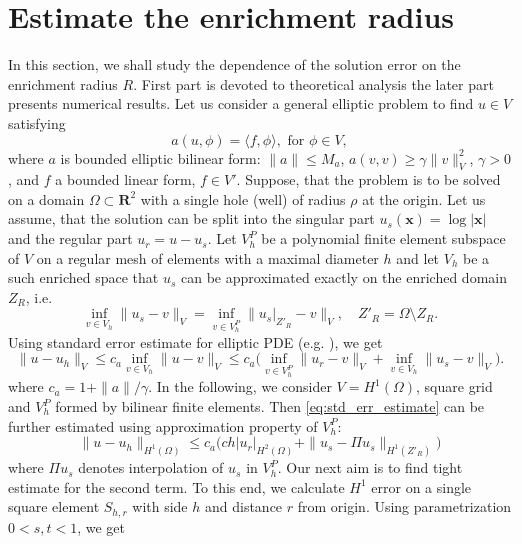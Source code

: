 \documentclass{elsarticle}
\def\vc#1{\mathbf{\boldsymbol{#1}}}     %
\def\abs#1{\left|#1\right|}
\def\norm#1{\| #1 \|}
\def\abs#1{| #1 |}
\newcommand{\R}{\mathbf{R}}
\begin{document}
\section{Estimate the enrichment radius} \label{sec:enrichemnt_radius}
In this section, we shall study the dependence of the solution error on the enrichment radius $R$. First part is devoted to 
theoretical analysis the later part presents numerical results.
Let us consider a general elliptic problem to find $u\in V$ satisfying
\[
   a(u, \phi) = \langle f, \phi \rangle, \text{ for } \phi \in V,
\]
where $a$ is bounded elliptic bilinear form: $\norm{a}\le M_a$, $a(v, v) \ge \gamma \norm{v}_V^2$, $\gamma>0$, and $f$ a bounded linear form, $f\in V'$. 
Suppose, that the problem is to be solved on a domain $\Omega \subset \R^2$ with a single hole (well) of radius $\rho$ at the origin. 
Let us assume, that the solution can be split into the singular part $u_s(\vc x)= \log |\vc x|$ and the regular part $u_r=u-u_s$.
Let $V^P_h$ be a polynomial finite element subspace of $V$ on a regular mesh of elements with a maximal diameter $h$
and let $V_h$ be a such enriched space that $u_s$ can be approximated exactly on the enriched domain $Z_R$, i.e.
\[
   \inf_{v\in V_h} \norm{u_s - v}_V = \inf_{v\in V^P_h} \norm{u_s|_{Z'_R} - v}_V, \quad Z'_R = \Omega\setminus Z_R.
\]
Using standard error estimate for elliptic PDE (e.g. \cite[Theorem 13.1]{ciarlet_basic_1991}), we get
\begin{equation}
    \label{eq:std_err_estimate}
    \norm{u - u_h}_{V} \le c_a \inf_{v \in V_h} \norm{u - v}_{V} 
    \le c_a \big(\inf_{v \in V^P_h} \norm{u_r - v}_{V} + \inf_{v \in V_h} \norm{u_s - v}_{V} \big).   
\end{equation}
where $c_a=1+\norm{a}/\gamma$.
In the following, we consider $V=H^1(\Omega)$, square grid and $V^P_h$ formed by bilinear finite elements. 
Then \eqref{eq:std_err_estimate} can be further estimated using approximation property of $V^P_h$:
\begin{equation}
    \label{eq:particular_estimate}
    \norm{u - u_h}_{H^1(\Omega)} \le c_a \big(c h \abs{u_r}_{H^2(\Omega)} + \norm{u_s - \Pi u_s}_{H^1(Z'_R)} \big)   
\end{equation}
where $\Pi u_s$ denotes interpolation of $u_s$ in $V^P_h$. Our next aim is to find tight estimate for the second term.
To this end, we calculate $H^1$ error on a single square element $S_{h,r}$ with side $h$ and distance $r$ from origin.
Using parametrization $0<s,t<1$,  we get
\end{document}
